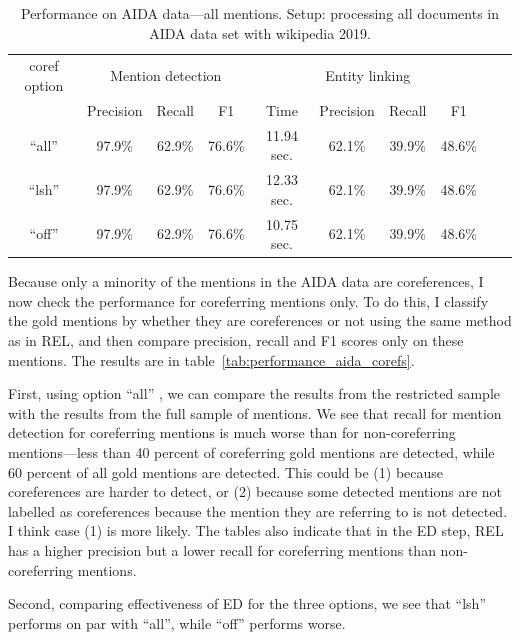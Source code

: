 \documentclass[a4paper,11pt]{article}
\numberwithin{equation}{section} %
\begin{document}
\begin{table}
 \begin{tabular}{c c c c c c c c c c}
\hline
 coref option & \multicolumn{3}{c}{Mention detection}  & \multicolumn{4}{c}{Entity linking}  \\
    \cmidrule(lr){2-4} \cmidrule(lr){5-8}
        & Precision & Recall & F1  & Time & Precision & Recall & F1 \\
 \hline 
 ``all'' & 97.9\% & 62.9\% & 76.6\% &  11.94 sec. & 62.1\% & 39.9\% & 48.6\% \\  
 ``lsh'' & 97.9\% & 62.9\% & 76.6\% &  12.33 sec. & 62.1\% & 39.9\% & 48.6\% \\
 ``off'' & 97.9\% & 62.9\% & 76.6\% &  10.75 sec.  & 62.1\% & 39.9\% & 48.6\% \\ 
\hline 
\end{tabular}
\caption{Performance on AIDA data---all mentions. Setup: processing all documents in AIDA data set with wikipedia 2019.}
\label{tab:performance_aida_full}
\end{table}


Because only a minority of the mentions in the AIDA data are coreferences, I now check the performance for coreferring mentions only. To do this, I classify the gold mentions by whether they are coreferences or not using the same method as in REL, and then compare precision, recall and F1 scores only on these mentions. The results are in table~\ref{tab:performance_aida_corefs}. 

First, using option ``all'' , we can compare the results from the restricted sample with the results from the full sample of mentions. We see that recall for mention detection for coreferring mentions is much worse than for non-coreferring mentions---less than 40 percent of coreferring gold mentions are detected, while 60 percent of all gold mentions are detected. 
This could be (1) because coreferences are harder to detect, or (2) because some detected mentions are not labelled as coreferences because the mention they are referring to is not detected. I think case (1) is more likely.
The tables also indicate that in the ED step, REL has a higher precision but a lower recall for coreferring mentions than non-coreferring mentions. 

Second, comparing effectiveness of ED for the three options, we see that ``lsh'' performs on par with ``all'', while ``off'' performs worse.
\end{document}

